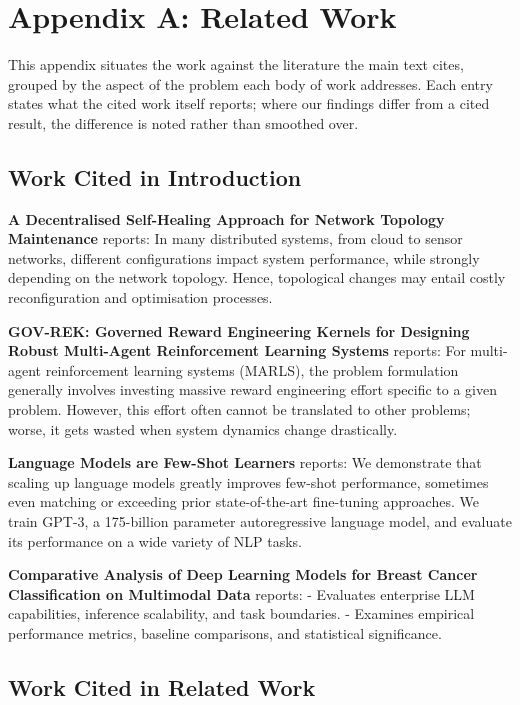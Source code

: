 \documentclass[10pt,twocolumn,letterpaper]{article}
\begin{document}
\section{Appendix A: Related Work}


This appendix situates the work against the literature the main text cites, grouped by the aspect of the problem each body of work addresses. Each entry states what the cited work itself reports; where our findings differ from a cited result, the difference is noted rather than smoothed over.


\subsection{Work Cited in Introduction}


\textbf{A Decentralised Self-Healing Approach for Network Topology Maintenance} \cite{arxiv_2010_11146} reports: In many distributed systems, from cloud to sensor networks, different configurations impact system performance, while strongly depending on the network topology. Hence, topological changes may entail costly reconfiguration and optimisation processes.

\textbf{GOV-REK: Governed Reward Engineering Kernels for Designing Robust Multi-Agent Reinforcement Learning Systems} \cite{arxiv_2404_01131} reports: For multi-agent reinforcement learning systems (MARLS), the problem formulation generally involves investing massive reward engineering effort specific to a given problem. However, this effort often cannot be translated to other problems; worse, it gets wasted when system dynamics change drastically.

\textbf{Language Models are Few-Shot Learners} \cite{arxiv_2005_14165} reports: We demonstrate that scaling up language models greatly improves few-shot performance, sometimes even matching or exceeding prior state-of-the-art fine-tuning approaches. We train GPT-3, a 175-billion parameter autoregressive language model, and evaluate its performance on a wide variety of NLP tasks.

\textbf{Comparative Analysis of Deep Learning Models for Breast Cancer Classification on Multimodal Data} \cite{crossref_10_1145_3689096_3689462} reports: - Evaluates enterprise LLM capabilities, inference scalability, and task boundaries. - Examines empirical performance metrics, baseline comparisons, and statistical significance.


\subsection{Work Cited in Related Work}
\end{document}
